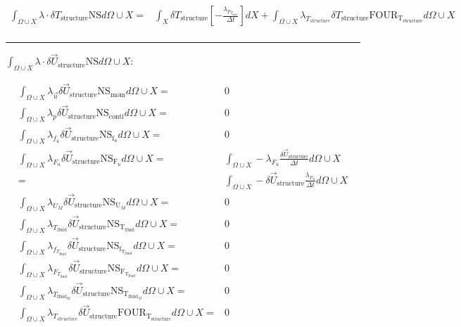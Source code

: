 \documentclass[10pt]{article} %
\begin{document}
\begin{center}
\begin{align*}
	\int_{\Omega \cup X} \lambda \cdot \delta T_{\text{structure}} \text{NS}d\Omega \cup X 
	=&\int_{X} \delta T_{\text{structure}} \left[ - \frac{\lambda_{F_{T_{\text{fluid}}}}}{\Delta t} \right] d X + \int_{\Omega \cup X} \lambda_{T_{structure}} \delta T_{\text{structure}} \text{FOUR}_{\text{T}_{\text{structure}}} d\Omega \cup X\\
\end{align*}
\noindent\rule[1ex]{\textwidth}{1pt}
\begin{flushleft}
	$\int_{\Omega \cup X} \lambda \cdot \delta \vec{U}_{\text{structure}} \text{NS}d\Omega \cup X :$
\end{flushleft}
\begin{align*}
	\int_{\Omega \cup X} \lambda_{\vec{u}} \delta \vec{U}_{\text{structure}} \text{NS}_{\text{mom}} d\Omega \cup X =&  0\\
	\int_{\Omega \cup X} \lambda_p \delta \vec{U}_{\text{structure}} \text{NS}_{\text{conti}} d\Omega \cup X =& 0\\
	\int_{\Omega \cup X} \lambda_{f_u} \delta \vec{U}_{\text{structure}} \text{NS}_{\text{f}_u} d\Omega \cup X =& 0\\
	\int_{\Omega \cup X} \lambda_{F_u} \delta \vec{U}_{\text{structure}} \text{NS}_{\text{F}_u} d\Omega \cup X 
	=& \int_{\Omega \cup X} -\lambda_{F_u}\frac{\delta \vec{U}_{\text{structure}}}{\Delta t} d \Omega \cup X\\
	=& \int_{\Omega \cup X} -\delta \vec{U}_{\text{structure}}\frac{\lambda_{F_u}}{\Delta t} d \Omega \cup X\\
	\int_{\Omega \cup X} \lambda_{U_M} \delta \vec{U}_{\text{structure}} \text{NS}_{\text{U}_M} d\Omega \cup X =& 0\\
	\int_{\Omega \cup X} \lambda_{T_{\text{fluid}}} \delta \vec{U}_{\text{structure}} \text{NS}_{\text{T}_{\text{fluid}}} d\Omega \cup X =& 0\\
	\int_{\Omega \cup X} \lambda_{f_{T_{\text{fluid}}}} \delta \vec{U}_{\text{structure}} \text{NS}_{\text{f}_{\text{T}_{\text{fluid}}}} d\Omega \cup X =& 0\\
	\int_{\Omega \cup X} \lambda_{F_{T_{\text{fluid}}}} \delta \vec{U}_{\text{structure}} \text{NS}_{\text{F}_{\text{T}_{\text{fluid}}}} d\Omega \cup X 
	=& 0\\
	\int_{\Omega \cup X} \lambda_{T_{\text{fluid}_M}} \delta \vec{U}_{\text{structure}} \text{NS}_{\text{T}_{\text{fluid}_M}} d\Omega \cup X =& 0\\
	\int_{\Omega \cup X} \lambda_{T_{structure}} \delta \vec{U}_{\text{structure}} \text{FOUR}_{\text{T}_{\text{structure}}} d\Omega \cup X =& 0\\

\end{align*}
\end{center}
\end{document}
